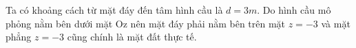\documentclass[preview]{standalone}
\begin{document}
\begin{center}
Ta có khoảng cách từ mặt đáy đến tâm hình cầu là $d = 3m$. Do hình cầu mô phỏng nằm bên dưới mặt Oz nên mặt đáy phải nằm bên trên mặt $z = -3$ và mặt phẳng $z = -3$ cũng chính là mặt đất thực tế.
\end{center}
\end{document}
